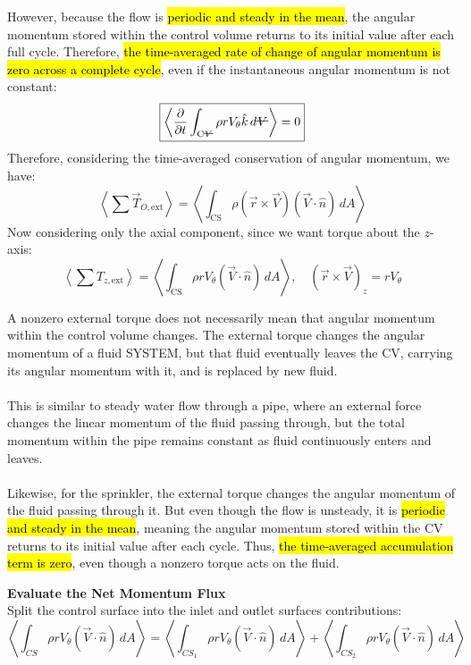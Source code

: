 ﻿\documentclass[12pt]{article}
\newcommand{\vol}{\mathord{\text{\ooalign{\hidewidth $V$\hidewidth\cr\kern-0.5pt\raisebox{0.8ex}{\rule[0pt]{1em}{0.5pt}}}}}}
\begin{document}
\begin{examplebox}
However, because the flow is \hl{periodic and steady in the mean}, the angular momentum stored within the control volume returns to its initial value after each full cycle. Therefore, \hl{the time-averaged rate of change of angular momentum is zero across a complete cycle}, even if the instantaneous angular momentum is not constant:
\[
\boxed{
\left\langle
\frac{\partial}{\partial t}
\int_{\mathrm{C}\vol}\rho rV_\theta\hat{k}\,d\vol
\right\rangle=0
}
\]
Therefore, considering the time-averaged conservation of angular momentum, we have:
\[
\left\langle\sum\vec T_{O,\mathrm{ext}}\right\rangle
=
\left\langle
\int_{\mathrm{CS}}\rho(\vec r\times\vec V)
(\vec V\cdot\hat n)\,dA
\right\rangle
\]
Now considering only the axial component, since we want torque about the $z$-axis:
\[
\boxed{
\left\langle\sum T_{z,\mathrm{ext}}\right\rangle
=
\left\langle
\int_{\mathrm{CS}}\rho rV_\theta
(\vec V\cdot\hat n)\,dA
\right\rangle,\quad (\vec r\times\vec V)_z=rV_\theta
}
\]
\begin{notebox}
A nonzero external torque does not necessarily mean that angular momentum within the control volume changes. The external torque changes the angular momentum of a fluid SYSTEM, but that fluid eventually leaves the CV, carrying its angular momentum with it, and is replaced by new fluid.\\\\
This is similar to steady water flow through a pipe, where an external force changes the linear momentum of the fluid passing through, but the total momentum within the pipe remains constant as fluid continuously enters and leaves.\\\\
Likewise, for the sprinkler, the external torque changes the angular momentum of the fluid passing through it. But even though the flow is unsteady, it is \hl{periodic and steady in the mean}, meaning the angular momentum stored within the CV returns to its initial value after each cycle. Thus, \hl{the time-averaged accumulation term is zero}, even though a nonzero torque acts on the fluid.
\end{notebox}
\textbf{Evaluate the Net Momentum Flux}\\
Split the control surface into the inlet and outlet surfaces contributions:
\[
\left\langle\int_{CS}\rho rV_\theta(\vec V\cdot\hat n)\,dA\right\rangle=\left\langle\int_{CS_1}\rho rV_\theta(\vec V\cdot\hat n)\,dA\right\rangle+\left\langle\int_{CS_2}\rho rV_\theta(\vec V\cdot\hat n)\,dA\right\rangle
\]
\end{examplebox}
\end{document}
